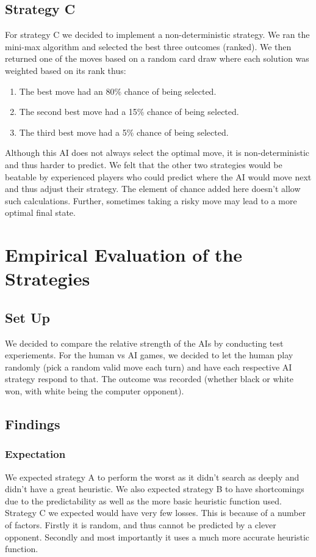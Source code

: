 \documentclass[12pt]{article}
\begin{document}
\subsection{Strategy C}
For strategy C we decided to implement a non-deterministic strategy. We ran the mini-max algorithm and selected the best three outcomes (ranked). We then returned one of the moves based on a random card draw where each solution was weighted based on its rank thus:
\begin{enumerate}
\item The best move had an 80\% chance of being selected.
\item The second best move had a 15\% chance of being selected.
\item The third best move had a 5\% chance of being selected.
\end{enumerate}
Although this AI does not always select the optimal move, it is non-deterministic and thus harder to predict. We felt that the other two strategies would be beatable by experienced players who could predict where the AI would move next and thus adjust their strategy. The element of chance added here doesn't allow such calculations. Further, sometimes taking a risky move may lead to a more optimal final state.

\section{Empirical Evaluation of the Strategies}

\subsection{Set Up}
We decided to compare the relative strength of the AIs by conducting test experiements. For the human vs AI games,
we decided to let the human play randomly (pick a random valid move each turn) and have each respective AI strategy
respond to that. The outcome was recorded (whether black or white won, with white being the computer opponent).

\subsection{Findings}
\subsubsection{Expectation}
We expected strategy A to perform the worst as it didn't search as deeply and didn't have a great heuristic. We also expected strategy B to have shortcomings due to the predictability as well as the more basic heuristic function used. Strategy C we expected would have very few losses. This is because of a number of factors. Firstly it is random, and thus cannot be predicted by a clever opponent. Secondly and most importantly it uses a much more accurate heuristic function.
\end{document}
